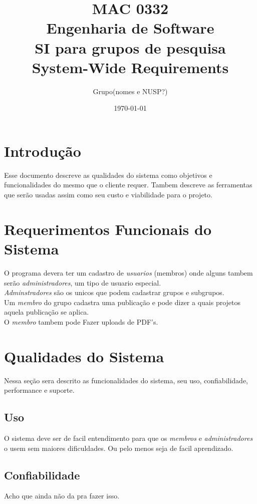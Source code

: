\documentclass[11pt, a4paper]{article}
\title{MAC 0332\\
	Engenharia de Software\\
	SI para grupos de pesquisa\\
	System-Wide Requirements}
\date{\today}
\author{Grupo(nomes e NUSP?)}
\begin{document}
	\maketitle
	\newpage
	
	\section{Introdução}
		Esse documento descreve as qualidades do sistema como objetivos e 
		funcionalidades do mesmo que o cliente requer. Tambem descreve as 
		ferramentas que serão usadas assim como seu custo e viabilidade para 
		o projeto. 
	\section{Requerimentos Funcionais do Sistema}
		O programa devera ter um cadastro de \textit{usuarios} (membros) onde 
		\indent alguns tambem serão \textit{administradores}, um tipo de usuario 
		especial.\\
		\indent \textit{Adminstradores} são os unicos que podem cadastrar 
		grupos e subgrupos.\\
		\indent Um \textit{membro} do grupo cadastra uma publicação e pode 
		dizer a quais projetos aquela publicação se aplica.\\
		\indent O \textit{membro} tambem pode Fazer uploads de PDF's.
		
	\section{Qualidades do Sistema}
		Nessa seção sera descrito as funcionalidades do sistema, seu uso, 
		confiabilidade, performance e suporte.
		
		\subsection{Uso}
			O sistema deve ser de facil entendimento para que os 
			\textit{membros} e \textit{administradores} o usem sem maiores 
			dificuldades. Ou pelo menos seja de facil aprendizado.
		
		\subsection{Confiabilidade}
			Acho que ainda não da pra fazer isso.
		
\end{document}
